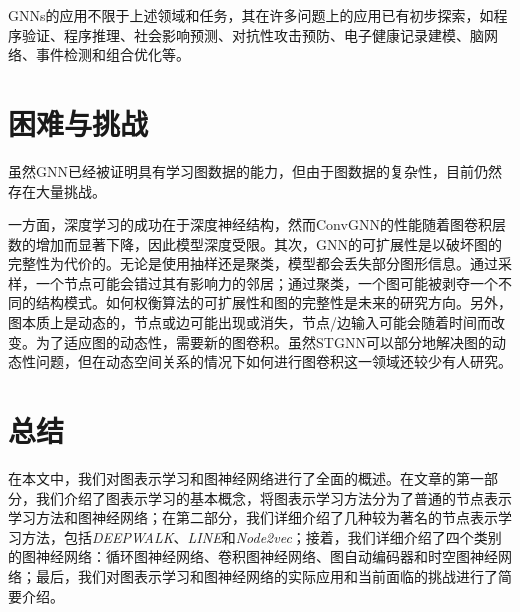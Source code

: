 GNNs的应用不限于上述领域和任务，其在许多问题上的应用已有初步探索，如程序验证、程序推理、社会影响预测、对抗性攻击预防、电子健康记录建模、脑网络、事件检测和组合优化等。

\section{困难与挑战}

虽然GNN已经被证明具有学习图数据的能力，但由于图数据的复杂性，目前仍然存在大量挑战。

一方面，深度学习的成功在于深度神经结构，然而ConvGNN的性能随着图卷积层数的增加而显著下降，因此模型深度受限。其次，GNN的可扩展性是以破坏图的完整性为代价的。无论是使用抽样还是聚类，模型都会丢失部分图形信息。通过采样，一个节点可能会错过其有影响力的邻居；通过聚类，一个图可能被剥夺一个不同的结构模式。如何权衡算法的可扩展性和图的完整性是未来的研究方向。另外，图本质上是动态的，节点或边可能出现或消失，节点/边输入可能会随着时间而改变。为了适应图的动态性，需要新的图卷积。虽然STGNN可以部分地解决图的动态性问题，但在动态空间关系的情况下如何进行图卷积这一领域还较少有人研究。


\section{总结}

在本文中，我们对图表示学习和图神经网络进行了全面的概述。在文章的第一部分，我们介绍了图表示学习的基本概念，将图表示学习方法分为了普通的节点表示学习方法和图神经网络；在第二部分，我们详细介绍了几种较为著名的节点表示学习方法，包括\emph{DEEPWALK}、\emph{LINE}和\emph{Node2vec}；接着，我们详细介绍了四个类别的图神经网络：循环图神经网络、卷积图神经网络、图自动编码器和时空图神经网络；最后，我们对图表示学习和图神经网络的实际应用和当前面临的挑战进行了简要介绍。
